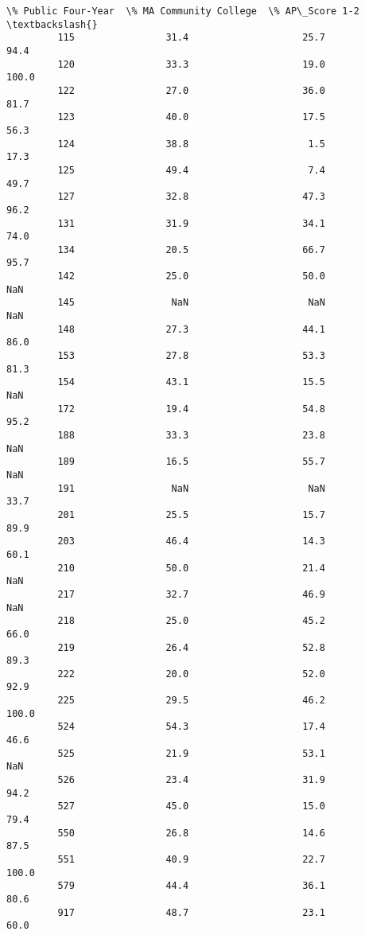 \documentclass[11pt]{article}
\begin{document}
\begin{Verbatim}[commandchars=\\\{\}]
              \% Public Four-Year  \% MA Community College  \% AP\_Score 1-2  \textbackslash{}
         115                31.4                    25.7            94.4   
         120                33.3                    19.0           100.0   
         122                27.0                    36.0            81.7   
         123                40.0                    17.5            56.3   
         124                38.8                     1.5            17.3   
         125                49.4                     7.4            49.7   
         127                32.8                    47.3            96.2   
         131                31.9                    34.1            74.0   
         134                20.5                    66.7            95.7   
         142                25.0                    50.0             NaN   
         145                 NaN                     NaN             NaN   
         148                27.3                    44.1            86.0   
         153                27.8                    53.3            81.3   
         154                43.1                    15.5             NaN   
         172                19.4                    54.8            95.2   
         188                33.3                    23.8             NaN   
         189                16.5                    55.7             NaN   
         191                 NaN                     NaN            33.7   
         201                25.5                    15.7            89.9   
         203                46.4                    14.3            60.1   
         210                50.0                    21.4             NaN   
         217                32.7                    46.9             NaN   
         218                25.0                    45.2            66.0   
         219                26.4                    52.8            89.3   
         222                20.0                    52.0            92.9   
         225                29.5                    46.2           100.0   
         524                54.3                    17.4            46.6   
         525                21.9                    53.1             NaN   
         526                23.4                    31.9            94.2   
         527                45.0                    15.0            79.4   
         550                26.8                    14.6            87.5   
         551                40.9                    22.7           100.0   
         579                44.4                    36.1            80.6   
         917                48.7                    23.1            60.0   
         

\end{Verbatim}
\end{document}
